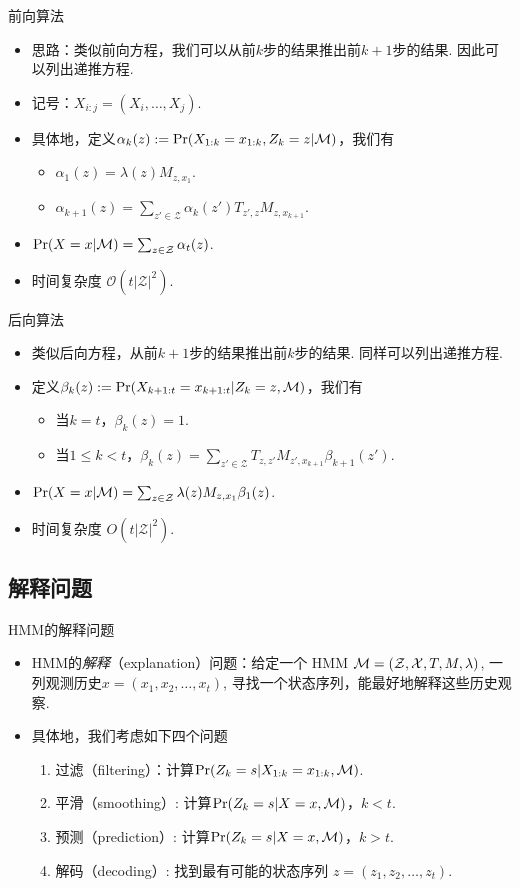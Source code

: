 {前向算法}
    \begin{itemize}
    \item 思路：类似前向方程，我们可以从前$k$步的结果推出前$k+1$步的结果. 因此可以列出递推方程.
    \item 记号：$X_{i:j}=(X_i,\dots,X_j)$.
    \item 具体地，定义$\alpha_k(z):= \Pr(X_{1:k}=x_{1:k}, Z_k=z| \mathcal M)$，我们有
    \begin{itemize}
        \item $\alpha_1(z) = \lambda(z)M_{z,x_1}$.
        \item $\alpha_{k+1}(z) = \sum_{z' \in \mathcal Z}\alpha_{k}(z')T_{z',z}M_{z,x_{k+1}}$.
    \end{itemize}
    \item $\Pr(X=x| \mathcal M) = \sum_{z\in \mathcal Z}\alpha_t(z)$.
    \item 时间复杂度 $\mathcal O(t|\mathcal Z|^2)$.
\end{itemize}



{后向算法}
   \begin{itemize}
    \item 类似后向方程，从前$k+1$步的结果推出前$k$步的结果. 同样可以列出递推方程.
    \item 定义$\beta_k(z):=\Pr(X_{k+1:t}=x_{k+1:t} | Z_k=z,\mathcal M)$，我们有
    \begin{itemize}
        \item 当$k = t$，$\beta_k(z) = 1$.
        \item 当$1 \le k < t$，$\beta_{k}(z) = \sum_{z' \in \mathcal Z}T_{z,z'}M_{z',x_{k+1}}\beta_{k+1}(z')$.
    \end{itemize}
    \item $\Pr(X=x| \mathcal M) = \sum_{z\in \mathcal Z}\lambda(z)M_{z,x_1}\beta_1(z)$.
    \item 时间复杂度 $O(t|\mathcal Z|^2)$.
\end{itemize}


\subsection{解释问题}
{HMM的解释问题}
    \begin{itemize}
    \item HMM的\emph{解释}（explanation）问题：给定一个 HMM $\mathcal M = (\mathcal Z, \mathcal X, T, M, \lambda)$, 一列观测历史$x = (x_1, x_2, \dots, x_t)$, 寻找一个状态序列，能最好地解释这些历史观察.
    \item 具体地，我们考虑如下四个问题
    \begin{enumerate}
        \item 过滤（filtering）：计算$\Pr(Z_k = s|X_{1:k}=x_{1:k}, \mathcal M)$.
        \item 平滑（smoothing）: 计算$\Pr(Z_k = s|X=x, \mathcal M)$，$k < t$.
        \item 预测（prediction）: 计算$\Pr(Z_k = s|X=x, \mathcal M)$，$k > t$.
        \item 解码（decoding）: 找到最有可能的状态序列 $z = (z_1, z_2, \dots, z_t)$.
    \end{enumerate}
\end{itemize}




